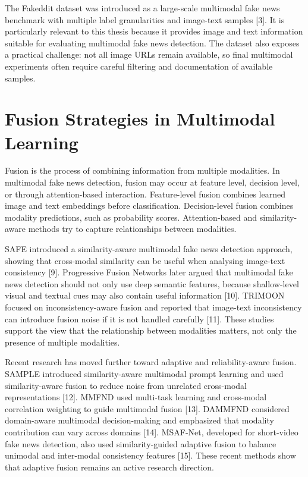 The Fakeddit dataset was introduced as a large-scale multimodal fake news benchmark with multiple label granularities and image-text samples [3]. It is particularly relevant to this thesis because it provides image and text information suitable for evaluating multimodal fake news detection. The dataset also exposes a practical challenge: not all image URLs remain available, so final multimodal experiments often require careful filtering and documentation of available samples.


\section{Fusion Strategies in Multimodal Learning}


Fusion is the process of combining information from multiple modalities. In multimodal fake news detection, fusion may occur at feature level, decision level, or through attention-based interaction. Feature-level fusion combines learned image and text embeddings before classification. Decision-level fusion combines modality predictions, such as probability scores. Attention-based and similarity-aware methods try to capture relationships between modalities.


SAFE introduced a similarity-aware multimodal fake news detection approach, showing that cross-modal similarity can be useful when analysing image-text consistency [9]. Progressive Fusion Networks later argued that multimodal fake news detection should not only use deep semantic features, because shallow-level visual and textual cues may also contain useful information [10]. TRIMOON focused on inconsistency-aware fusion and reported that image-text inconsistency can introduce fusion noise if it is not handled carefully [11]. These studies support the view that the relationship between modalities matters, not only the presence of multiple modalities.


Recent research has moved further toward adaptive and reliability-aware fusion. SAMPLE introduced similarity-aware multimodal prompt learning and used similarity-aware fusion to reduce noise from unrelated cross-modal representations [12]. MMFND used multi-task learning and cross-modal correlation weighting to guide multimodal fusion [13]. DAMMFND considered domain-aware multimodal decision-making and emphasized that modality contribution can vary across domains [14]. MSAF-Net, developed for short-video fake news detection, also used similarity-guided adaptive fusion to balance unimodal and inter-modal consistency features [15]. These recent methods show that adaptive fusion remains an active research direction.


